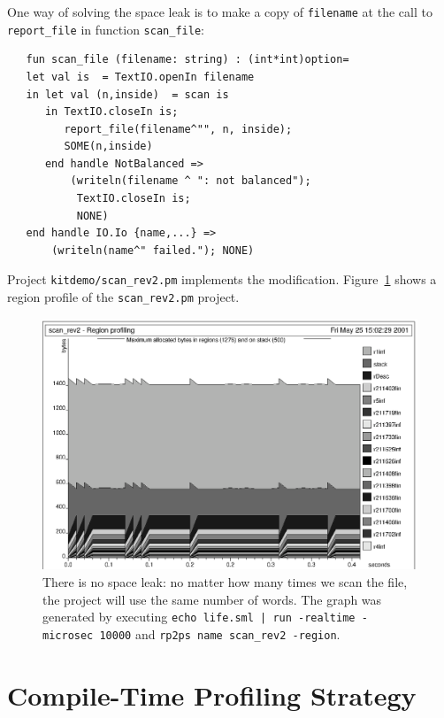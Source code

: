\documentclass[12pt]{book}
\begin{document}
One way of solving the space leak is to make a copy of {\tt filename}
at the call to {\tt report\_file} in function {\tt scan\_file}:
\begin{verbatim}
   fun scan_file (filename: string) : (int*int)option=
   let val is  = TextIO.openIn filename 
   in let val (n,inside)  = scan is
      in TextIO.closeIn is; 
         report_file(filename^"", n, inside);
         SOME(n,inside)
      end handle NotBalanced => 
          (writeln(filename ^ ": not balanced");
           TextIO.closeIn is;
           NONE)
   end handle IO.Io {name,...} => 
       (writeln(name^" failed."); NONE)
\end{verbatim}
Project 
%
{\tt kitdemo/scan\_rev2.pm} implements the modification.
Figure~\ref{scan_rev2_1.fig} shows a region profile of the
\texttt{scan\_rev2.pm} project.
\begin{figure}
\begin{center}
\includegraphics{scan_rev2_1.ps}
\end{center}
\caption{There is no space leak: no matter how many times we scan the
  file, the project will use the same number of words. The graph was
  generated by executing \texttt{echo life.sml | run -realtime -microsec 10000} and \texttt{rp2ps
    name scan\_rev2 -region}.}
\label{scan_rev2_1.fig}
\end{figure}

\section{Compile-Time Profiling Strategy}
\end{document}
